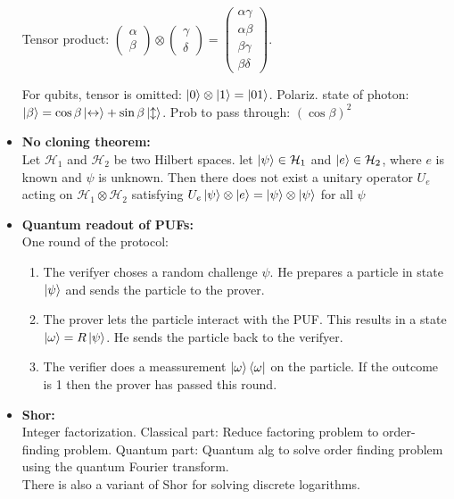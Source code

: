 \documentclass[twocolumn,9pt]{extarticle}
\begin{document}
\begin{itemize}
	Tensor product:
	$\begin{pmatrix}\alpha \\ \beta\end{pmatrix} \otimes \begin{pmatrix}\gamma \\ \delta\end{pmatrix} = \begin{pmatrix}\alpha\gamma \\ \alpha\beta \\ \beta\gamma \\ \beta\delta\end{pmatrix}$.

	For qubits, tensor is omitted: $\ket{0} \otimes \ket{1} = \ket{01}$. Polariz. state of photon: $\ket{\beta} = \cos \beta \ket{\leftrightarrow} + \sin \beta \ket{\updownarrow}$. Prob to pass through: $(\cos \beta)^2$

	\item \textbf{No cloning theorem: } \\
	Let $\mathcal{H}_1$ and $\mathcal{H}_2$ be two Hilbert spaces. let $\ket{\psi} \in \mathcal{H}_1$ and $\ket{e} \in \mathcal{H}_2$, where $e$ is known and $\psi$ is unknown. Then there does not exist a unitary operator $U_e$ acting on $\mathcal{H}_1 \otimes \mathcal{H}_2$ satisfying $U_e\ket{\psi} \otimes \ket{e} = \ket{\psi} \otimes \ket{\psi}$ for all $\psi$


	\item \textbf{Quantum readout of PUFs:} \\
	One round of the protocol:
	\begin{enumerate}
		\item The verifyer choses a random challenge $\psi$. He prepares a particle in state $\ket{\psi}$ and sends the particle to the prover.
		\item The prover lets the particle interact with the PUF. This results in a state $\ket{\omega} =  R\ket{\psi}$. He sends the particle back to the verifyer.
		\item The verifier does a meassurement $\ket{\omega}\bra{\omega}$ on the particle. If the outcome is 1 then the prover has passed this round.
	\end{enumerate}

	\item \textbf{Shor:} \\
	Integer factorization. Classical part: Reduce factoring problem to order-finding problem. Quantum part: Quantum alg to solve order finding problem using the quantum Fourier transform.\\
	There is also a variant of Shor for solving discrete logarithms.

\end{itemize}
\end{document}
